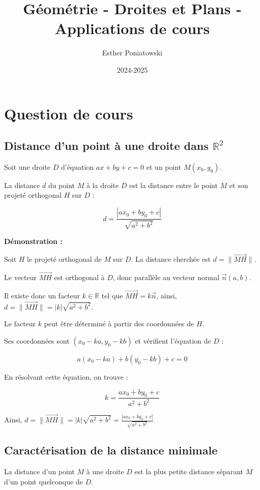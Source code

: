 \documentclass[10pt,a4paper]{article}
\title{Géométrie - Droites et Plans - Applications de cours}
\author{Esther Poniatowski}
\date{2024-2025}
\begin{document}
\maketitle

\section*{Question de cours}

\subsection*{Distance d'un point à une droite dans $\mathbb{R}^2$}

Soit une droite $D$ d'équation $ax + by + c = 0$ et un point $M(x_0, y_0)$.

La distance $d$ du point $M$ à la droite $D$ est la distance entre le point $M$ et son projeté
orthogonal $H$ sur $D$ :

$$ d = \frac{|ax_0 + by_0 + c|}{\sqrt{a^2 + b^2}} $$

\textbf{Démonstration :}

Soit $H$ le projeté orthogonal de $M$ sur $D$. La distance cherchée est $d = \|\vec{MH}\|$.

Le vecteur $\vec{MH}$ est orthogonal à $D$, donc parallèle au vecteur normal $\vec{n}(a,b)$.

Il existe donc un facteur $k \in \mathbb{R}$ tel que $\vec{MH} = k\vec{n}$,
ainsi, $d = \|\vec{MH}\| = |k|\sqrt{a^2 + b^2}$.

Le facteur $k$ peut être déterminé à partir des coordonnées de $H$.

Ses coordonnées sont $(x_0 - ka, y_0 - kb)$ et vérifient l'équation de $D$ :

$$ a(x_0 - ka) + b(y_0 - kb) + c = 0 $$

En résolvant cette équation, on trouve :

$$ k = \frac{ax_0 + by_0 + c}{a^2 + b^2} $$

Ainsi, $d = \|\vec{MH}\| = |k|\sqrt{a^2 + b^2} = \frac{|ax_0 + by_0 + c|}{\sqrt{a^2 + b^2}}$

\subsection*{Caractérisation de la distance minimale}

La distance d'un point $M$ à une droite $D$ est la plus petite distance séparant $M$ d'un point quelconque de $D$.
\end{document}
